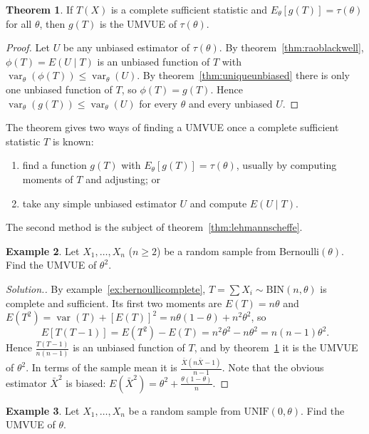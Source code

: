 \documentclass[12pt,a4paper]{report}
\theoremstyle{definition}
\newtheorem{thm}{Theorem}[section]
\newtheorem{exa}[thm]{Example}
\DeclareMathOperator{\var}{var}
\newenvironment{solution}
  {\renewcommand{\qedsymbol}{}\begin{proof}[\textit{Solution}.]}
  {\end{proof}}
\begin{document}
\begin{thm}
\label{thm:umvue}
If $T(X)$ is a complete sufficient statistic and $E_\theta\left[g(T)\right] = \tau(\theta)$
for all $\theta$, then $g(T)$ is the UMVUE of $\tau(\theta)$.
\end{thm}

\begin{proof}
Let $U$ be any unbiased estimator of $\tau(\theta)$. By
theorem~\ref{thm:raoblackwell}, $\phi(T) = E(U\mid T)$ is an unbiased function of
$T$ with $\var_\theta(\phi(T))\le\var_\theta(U)$. By theorem~\ref{thm:uniqueunbiased}
there is only one unbiased function of $T$, so $\phi(T) = g(T)$. Hence
$\var_\theta(g(T))\le\var_\theta(U)$ for every $\theta$ and every unbiased $U$.
\end{proof}

The theorem gives two ways of finding a UMVUE once a complete sufficient statistic
$T$ is known:
\begin{enumerate}
\item find a function $g(T)$ with $E_\theta\left[g(T)\right] = \tau(\theta)$, usually by
computing moments of $T$ and adjusting; or
\item take any simple unbiased estimator $U$ and compute $E(U\mid T)$.
\end{enumerate}
The second method is the subject of theorem~\ref{thm:lehmannscheffe}.

\begin{exa}
\label{ex:bernoullithetasq}
Let $X_1, \dots, X_n$ ($n\ge 2$) be a random sample from Bernoulli$(\theta)$. Find
the UMVUE of $\theta^2$.
\end{exa}

\begin{solution}
By example~\ref{ex:bernoullicomplete}, $T = \sum X_i\sim\text{BIN}(n, \theta)$ is
complete and sufficient. Its first two moments are $E(T) = n\theta$ and
$E(T^2) = \var(T) + \left[E(T)\right]^2 = n\theta(1 - \theta) + n^2\theta^2$, so
\[E\left[T(T - 1)\right] = E(T^2) - E(T) = n^2\theta^2 - n\theta^2 = n(n - 1)\theta^2 .\]
Hence $\frac{T(T - 1)}{n(n - 1)}$ is an unbiased function of $T$, and by
theorem~\ref{thm:umvue} it is the UMVUE of $\theta^2$. In terms of the sample mean
it is $\frac{\bar X(n\bar X - 1)}{n - 1}$. Note that the obvious estimator $\bar X^2$
is biased: $E(\bar X^2) = \theta^2 + \frac{\theta(1 - \theta)}{n}$.
\end{solution}

\begin{exa}
\label{ex:uniformumvue}
Let $X_1, \dots, X_n$ be a random sample from $\text{UNIF}(0, \theta)$. Find the
UMVUE of $\theta$.
\end{exa}
\end{document}
